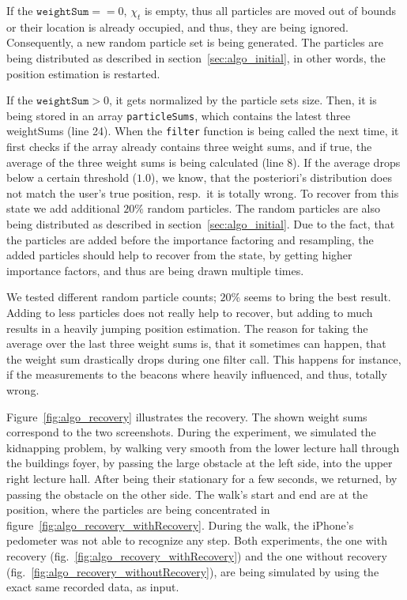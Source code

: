 If the $\texttt{weightSum} == 0$, $\chi_t$ is empty, thus all particles are moved out of bounds or their location is already occupied, and thus, they are being ignored. Consequently, a new random particle set is being generated. The particles are being distributed as described in section~\ref{sec:algo_initial}, in other words, the position estimation is restarted.

If the $\texttt{weightSum} > 0$, it gets normalized by the particle sets size. Then, it is being stored in an array \texttt{particleSums}, which contains the latest three weightSums (line 24). When the \texttt{filter} function is being called the next time, it first checks if the array already contains three weight sums, and if true, the average of the three weight sums is being calculated (line 8). If the average drops below a certain threshold ($1.0$), we know, that the posteriori's distribution does not match the user's true position, resp.\ it is totally wrong. To recover from this state we add additional $20\%$ random particles. The random particles are also being distributed as described in section~\ref{sec:algo_initial}. Due to the fact, that the particles are added before the importance factoring and resampling, the added particles should help to recover from the state, by getting higher importance factors, and thus are being drawn multiple times.

We tested different random particle counts; $20\%$ seems to bring the best result. Adding to less particles does not really help to recover, but adding to much results in a heavily jumping position estimation. The reason for taking the average over the last three weight sums is, that it sometimes can happen, that the weight sum drastically drops during one filter call. This happens for instance, if the measurements to the beacons where heavily influenced, and thus, totally wrong.

Figure~\ref{fig:algo_recovery} illustrates the recovery. The shown weight sums correspond to the two screenshots. During the experiment, we simulated the kidnapping problem, by walking very smooth from the lower lecture hall through the buildings foyer, by passing the large obstacle at the left side, into the upper right lecture hall. After being their stationary for a few seconds, we returned, by passing the obstacle on the other side. The walk's start and end are at the position, where the particles are being concentrated in figure~\ref{fig:algo_recovery_withRecovery}. During the walk, the iPhone's pedometer was not able to recognize any step. Both experiments, the one with recovery (fig.~\ref{fig:algo_recovery_withRecovery}) and the one without recovery (fig.~\ref{fig:algo_recovery_withoutRecovery}), are being simulated by using the exact same recorded data, as input.

